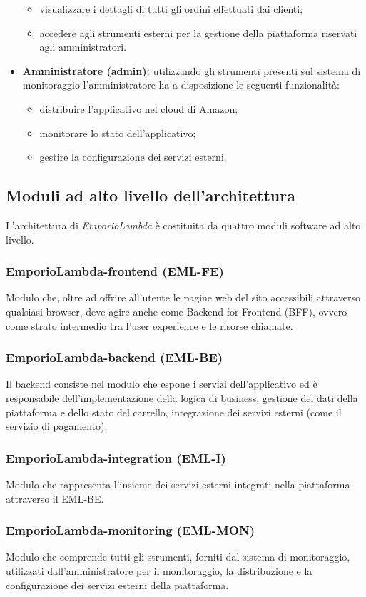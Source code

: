 \begin{itemize}
\begin{itemize}
	\item visualizzare i dettagli di tutti gli ordini effettuati dai clienti;
	\item accedere agli strumenti esterni per la gestione della piattaforma riservati agli amministratori.
	\end{itemize}
\item \textbf{Amministratore (admin):} utilizzando gli strumenti presenti sul sistema di monitoraggio l'amministratore ha a disposizione le seguenti funzionalità:
	\begin{itemize}
	\item distribuire l'applicativo nel cloud di Amazon;
	\item monitorare lo stato dell'applicativo;
	\item gestire la configurazione dei servizi esterni.
	\end{itemize}
\end{itemize}
\subsection{Moduli ad alto livello dell'architettura}
L'architettura di \textit{EmporioLambda} è costituita da quattro moduli software ad alto livello.
\subsubsection{EmporioLambda-frontend (EML-FE)}
Modulo che, oltre ad offrire all'utente le pagine web del sito accessibili attraverso qualsiasi browser, deve agire anche come Backend for Frontend (BFF), ovvero come strato intermedio tra l'user experience e le risorse chiamate.
\subsubsection{EmporioLambda-backend (EML-BE)}
Il backend consiste nel modulo che espone i servizi dell'applicativo ed è responsabile dell'implementazione della logica di business, gestione dei dati della piattaforma e dello stato del carrello, integrazione dei servizi esterni (come il servizio di pagamento).
\subsubsection{EmporioLambda-integration (EML-I)}
Modulo che rappresenta l'insieme dei servizi esterni integrati nella piattaforma attraverso il EML-BE.
\subsubsection{EmporioLambda-monitoring (EML-MON)}
Modulo che comprende tutti gli strumenti, forniti dal sistema di monitoraggio, utilizzati dall'amministratore per il monitoraggio, la distribuzione e la configurazione dei servizi esterni della piattaforma.
